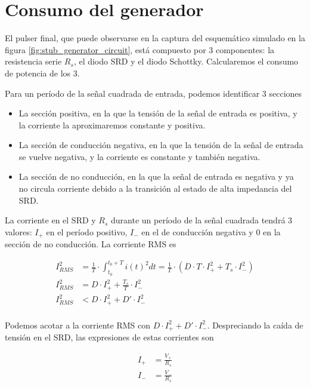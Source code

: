 \section{Consumo del generador}
\label{sec:pulser_power}

El pulser final, que puede observarse en la captura del esquemático simulado en
la figura \ref{fig:stub_generator_circuit}, está compuesto por 3 componentes: la
resistencia serie $R_s$, el diodo SRD y el diodo Schottky. Calcularemos el
consumo de potencia de los 3.

Para un período de la señal cuadrada de entrada, podemos identificar 3 secciones

\begin{itemize}
    \item La sección positiva, en la que la tensión de la señal de entrada es
        positiva, y la corriente la aproximaremos constante y positiva.
    \item La sección de conducción negativa, en la que la tensión de la señal de
        entrada se vuelve negativa, y la corriente es constante y también
        negativa.
    \item La sección de no conducción, en la que la señal de entrada es
        negativa y ya no circula corriente debido a la transición al estado de
        alta impedancia del SRD.
\end{itemize}

La corriente en el SRD y $R_s$ durante un período de la señal cuadrada tendrá 3
valores: $I_+$ en el período positivo, $I_-$ en el de conducción negativa y $0$
en la sección de no conducción. La corriente RMS es

\begin{equation}
    \begin{aligned}
        I_{RMS}^2 &= \frac{1}{T} \cdot \int_{t_0}^{t_0+T} i(t)^2dt = \frac{1}{T}
        \cdot \left( D \cdot T \cdot I_+^2 + T_s \cdot I_-^2 \right) \\
        I_{RMS}^2 &= D \cdot I_+^2 + \frac{T_s}{T} \cdot I_-^2 \\
        I_{RMS}^2 &< D \cdot I_+^2 + D' \cdot I_-^2 \\
    \end{aligned}
\end{equation}

Podemos acotar a la corriente RMS con $D \cdot I_+^2 + D' \cdot I_-^2$.
Despreciando la caída de tensión en el SRD, las expresiones de estas corrientes son

\begin{equation}
    \begin{aligned}
        I_+ &= \frac{V_+}{R_s} \\
        I_- &= \frac{V_-}{R_s} \\
    \end{aligned}
\end{equation}

